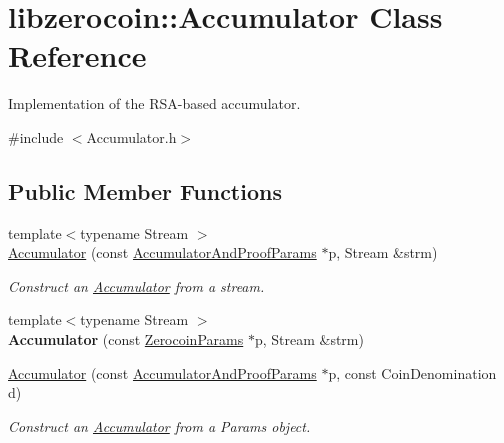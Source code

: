 \hypertarget{classlibzerocoin_1_1_accumulator}{}\section{libzerocoin\+:\+:Accumulator Class Reference}
\label{classlibzerocoin_1_1_accumulator}


Implementation of the R\+S\+A-\/based accumulator.  




{\ttfamily \#include $<$Accumulator.\+h$>$}

\subsection*{Public Member Functions}
\begin{DoxyCompactItemize}
\item 
{\footnotesize template$<$typename Stream $>$ }\\\mbox{\hyperlink{classlibzerocoin_1_1_accumulator_a215f60913d092b292e753b83da226723}{Accumulator}} (const \mbox{\hyperlink{classlibzerocoin_1_1_accumulator_and_proof_params}{Accumulator\+And\+Proof\+Params}} $\ast$p, Stream \&strm)
\begin{DoxyCompactList}\small\item\em Construct an \mbox{\hyperlink{classlibzerocoin_1_1_accumulator}{Accumulator}} from a stream. \end{DoxyCompactList}\item 
\mbox{\label{classlibzerocoin_1_1_accumulator_acde0e69159349a5af1e50e0ab808b8a5}} 
{\footnotesize template$<$typename Stream $>$ }\\{\bfseries Accumulator} (const \mbox{\hyperlink{classlibzerocoin_1_1_zerocoin_params}{Zerocoin\+Params}} $\ast$p, Stream \&strm)
\item 
\mbox{\hyperlink{classlibzerocoin_1_1_accumulator_ab50daca64cafc7b8e304e173b4988a29}{Accumulator}} (const \mbox{\hyperlink{classlibzerocoin_1_1_accumulator_and_proof_params}{Accumulator\+And\+Proof\+Params}} $\ast$p, const Coin\+Denomination d)
\begin{DoxyCompactList}\small\item\em Construct an \mbox{\hyperlink{classlibzerocoin_1_1_accumulator}{Accumulator}} from a Params object. \end{DoxyCompactList}\item 
\mbox{\label{classlibzerocoin_1_1_accumulator_ae69c62cdef1144ad1fd7d5012f120579}} 

\end{DoxyCompactItemize}
